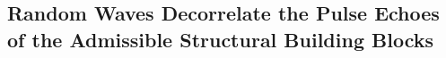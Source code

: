 

\subsection{Random Waves Decorrelate the Pulse Echoes of the Admissible Structural Building Blocks}


